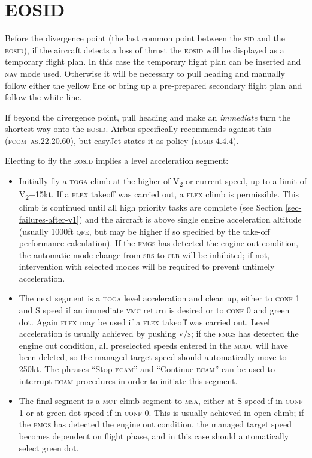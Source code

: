 \documentclass[a5paper,11pt,twoside]{book}
\newcommand{\ac}[1]{{\scshape\MakeLowercase{#1}}}
\newcommand{\inlcite}[1]{{\ac{#1}}}
\newcommand{\multicite}[1]{%
  \nopagebreak
  \noindent{{\color{blue}\footnotesize[ \inlcite{#1} ]}}
}
\newcommand{\V}[1]{V\textsubscript{#1}}
\begin{document}
\multicite{FCTM~PRO.AEP.ENG}

\section{EOSID}
\label{sec-eosid}

Before the divergence point (the last common point between the \ac{SID} and the
\ac{EOSID}), if the aircraft detects a loss of thrust the \ac{EOSID} will be
displayed as a temporary flight plan. In this case the temporary flight plan can
be inserted and \ac{NAV} mode used. Otherwise it will be necessary to pull
heading and manually follow either the yellow line or bring up a pre-prepared
secondary flight plan and follow the white line.

If beyond the divergence point, pull heading and make an \emph{immediate} turn
the shortest way onto the \ac{EOSID}. Airbus specifically recommends against
this (\inlcite{FCOM~AS.22.20.60}), but easyJet states it as policy
(\inlcite{EOMB 4.4.4}).

Electing to fly the \ac{EOSID} implies a level acceleration segment:

\begin{itemize}
\item Initially fly a \ac{TOGA} climb at the higher of \V{2} or current speed,
  up to a limit of \V{2}+15kt. If a \ac{FLEX} takeoff was carried out, a
  \ac{FLEX} climb is permissible. This climb is continued until all high
  priority tasks are complete (see Section \ref{sec-failures-after-v1}) and the aircraft is
  above single engine acceleration altitude (usually 1000ft \ac{QFE}, but may be
  higher if so specified by the take-off performance calculation). If the
  \ac{FMGS} has detected the engine out condition, the automatic mode change
  from \ac{SRS} to \ac{CLB} will be inhibited; if not, intervention with
  selected modes will be required to prevent untimely acceleration.

\item The next segment is a \ac{TOGA} level acceleration and clean up, either to
  \ac{Conf} 1 and S speed if an immediate \ac{VMC} return is desired or to
  \ac{Conf} 0 and green dot. Again \ac{FLEX} may be used if a \ac{FLEX} takeoff
  was carried out. Level acceleration is usually achieved by pushing \ac{V/S};
  if the \ac{FMGS} has detected the engine out condition, all preselected speeds
  entered in the \ac{MCDU} will have been deleted, so the managed target speed
  should automatically move to 250kt. The phrases ``Stop \ac{ECAM}'' and
  ``Continue \ac{ECAM}'' can be used to interrupt \ac{ECAM} procedures in order
  to initiate this segment.

\item The final segment is a \ac{MCT} climb segment to \ac{MSA}, either at S
  speed if in \ac{Conf} 1 or at green dot speed if in \ac{Conf} 0. This is
  usually achieved in open climb; if the \ac{FMGS} has detected the engine out
  condition, the managed target speed becomes dependent on flight phase, and in
  this case should automatically select green dot.
\end{itemize}
\end{document}
